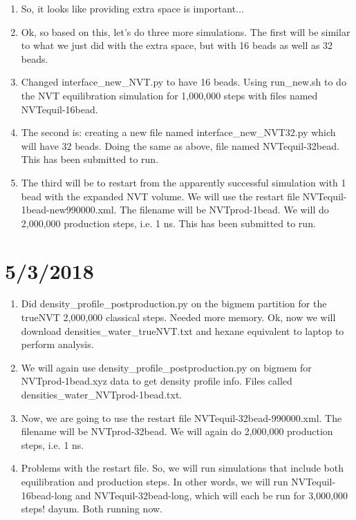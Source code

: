 \documentclass[12pt,reqno]{amsart}
\numberwithin{equation}{section}
\begin{document}
\begin{enumerate}
\item So, it looks like providing extra space is important...

\item Ok, so based on this, let's do three more simulations.  The first will be similar to what we just did with the extra space, but with 16 beads as well as 32 beads.  
\item Changed interface\_new\_NVT.py to have 16 beads.  Using run\_new.sh to do the NVT equilibration simulation for 1,000,000 steps with files named NVTequil-16bead.
\item The second is: creating a new file named interface\_new\_NVT32.py which will have 32 beads.  Doing the same as above, file named NVTequil-32bead.  This has been submitted to run.  
\item The third will be to restart from the apparently successful simulation with 1 bead with the expanded NVT volume.  We will use the restart file NVTequil-1bead-new990000.xml.   The filename will be NVTprod-1bead.  We will do 2,000,000 production steps, i.e. 1 ns.  This has been submitted to run.

 

\end{enumerate}

\section{5/3/2018}

\begin{enumerate}
\item Did density\_profile\_postproduction.py on the bigmem partition for the trueNVT 2,000,000 classical steps.  Needed more memory.  Ok, now we will download densities\_water\_trueNVT.txt and hexane equivalent to laptop to perform analysis.   
\item We will again use density\_profile\_postproduction.py on bigmem for NVTprod-1bead.xyz data to get density profile info.  Files called densities\_water\_NVTprod-1bead.txt.
\item Now, we are going to use the restart file NVTequil-32bead-990000.xml.  The filename will be NVTprod-32bead.  We will again do 2,000,000 production steps, i.e. 1 ns.  
\item Problems with the restart file.  So, we will run simulations that include both equilibration and production steps.  In other words, we will run NVTequil-16bead-long and NVTequil-32bead-long, which will each be run for 3,000,000 steps!  dayum.  Both running now.
\end{enumerate}
\end{document}
